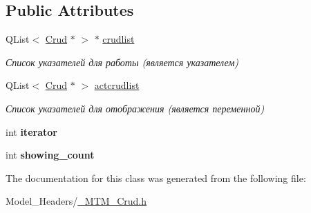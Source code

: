 \subsection*{Public Attributes}
\begin{DoxyCompactItemize}
\item 
\mbox{\label{class_m_t_m___crud_ab27a17e6611720e83445f1b6a72cee4d}} 
Q\+List$<$ \mbox{\hyperlink{class_crud}{Crud}} $\ast$ $>$ $\ast$ \mbox{\hyperlink{class_m_t_m___crud_ab27a17e6611720e83445f1b6a72cee4d}{crudlist}}
\begin{DoxyCompactList}\small\item\em Список указателей для работы (является указателем) \end{DoxyCompactList}\item 
\mbox{\label{class_m_t_m___crud_adb15a6abf5657eafb40d2b4a8b8fba3e}} 
Q\+List$<$ \mbox{\hyperlink{class_crud}{Crud}} $\ast$ $>$ \mbox{\hyperlink{class_m_t_m___crud_adb15a6abf5657eafb40d2b4a8b8fba3e}{actcrudlist}}
\begin{DoxyCompactList}\small\item\em Список указателей для отображения (является переменной) \end{DoxyCompactList}\item 
\mbox{\label{class_m_t_m___crud_a81488d01559747d20f0bc36a01d95094}} 
int {\bfseries iterator}
\item 
\mbox{\label{class_m_t_m___crud_a40d42af50c5b974c1b292b3432d743b2}} 
int {\bfseries showing\+\_\+count}
\end{DoxyCompactItemize}


The documentation for this class was generated from the following file\+:\begin{DoxyCompactItemize}
\item 
Model\+\_\+\+Headers/\mbox{\hyperlink{___m_t_m___crud_8h}{\+\_\+\+M\+T\+M\+\_\+\+Crud.\+h}}\end{DoxyCompactItemize}
